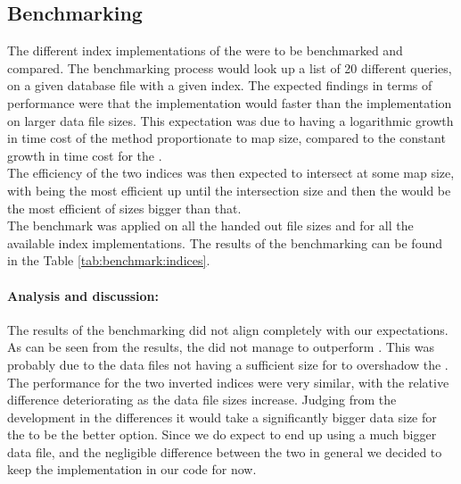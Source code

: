\subsection{Benchmarking}
The different index implementations of the were to be benchmarked and compared. 
The benchmarking process would look up a list of 20 different queries, on a given database file with a given index. The expected findings in terms of performance were that the  implementation would faster than the  implementation on larger data file sizes. This expectation was due to  having a logarithmic growth in time cost of the  method proportionate to map size, compared to the constant growth in time cost for the . \\
The efficiency of the two indices was then expected to intersect at some map size, with  being the most efficient up until the intersection size and then the  would be the most efficient of sizes bigger than that. \\
The benchmark was applied on all the handed out file sizes and for all the available index implementations. The results of the benchmarking can be found in the Table \ref{tab:benchmark:indices}.

\paragraph{Analysis and discussion:}
The results of the benchmarking did not align completely with our expectations. As can be seen from the results, the  did not manage to outperform . This was probably due to the data files not having a sufficient size for  to overshadow the . The performance for the two inverted indices were very similar, with the relative difference deteriorating as the data file sizes increase. Judging from the development in the differences it would take a significantly bigger data size for the  to be the better option. Since we do expect to end up using a much bigger data file, and the negligible difference between the two in general we decided to keep the  implementation in our code for now.

